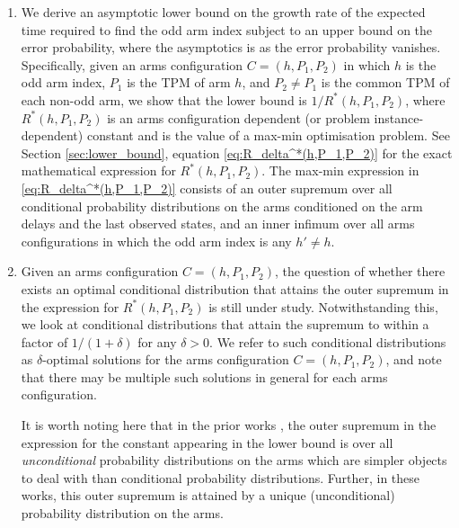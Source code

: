 \begin{enumerate}
	\item  We derive an asymptotic lower bound on {\color{black} the growth rate of} the expected time required to find the odd arm index subject to an upper bound on the error probability, where the asymptotics is as the error probability vanishes. Specifically, given an arms configuration $C=(h, P_1, P_2)$ in which $h$ is the odd arm index, $P_1$ is the TPM of arm $h$, and $P_2\neq P_1$ is the common TPM of each non-odd arm, we show that the lower bound is $1/R^*(h, P_1, P_2)$, where $R^*(h, P_1, P_2)$ is an arms configuration dependent (or problem instance-dependent) constant and is the value of a max-min optimisation problem. See Section \ref{sec:lower_bound}, equation \eqref{eq:R_delta^*(h,P_1,P_2)} for the exact mathematical expression for $R^*(h, P_1, P_2)$. The max-min expression in  \eqref{eq:R_delta^*(h,P_1,P_2)} consists of an outer supremum over all conditional probability distributions on the arms conditioned on the arm delays and the last observed states, and an inner infimum over all arms configurations in which the odd arm index is any $h'\neq h$.
	
	\item Given an arms configuration $C=(h, P_1, P_2)$, the question of whether there exists an optimal conditional distribution that attains the outer supremum in the expression for $R^*(h, P_1, P_2)$ is still under study. Notwithstanding this, we look at conditional distributions that attain the supremum to within a factor of $1/(1+\delta)$ for any $\delta>0$. We refer to such conditional distributions as $\delta$-optimal solutions for the arms configuration $C=(h, P_1, P_2)$, and note that there may be multiple such solutions in general for each arms configuration.
	
	It is worth noting here that in the prior works \cite{vaidhiyan2017learning, prabhu2017optimal}, the outer supremum in the expression for the constant appearing in the lower bound is over all {\em unconditional} probability distributions on the arms which are simpler objects to deal with than conditional probability distributions. Further, in these works, this outer supremum is attained by a unique (unconditional) probability distribution on the arms.


\end{enumerate}

